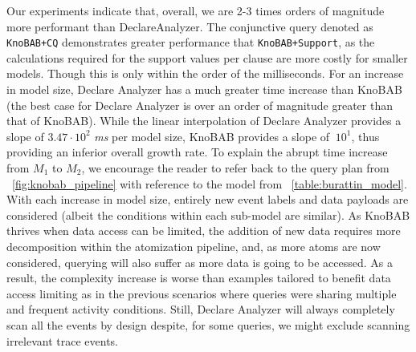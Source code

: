 Our experiments indicate that, overall, we are 2-3 times orders of magnitude more performant than DeclareAnalyzer. The conjunctive query denoted as \texttt{KnoBAB+CQ} demonstrates greater performance that \texttt{KnoBAB+Support}, as the calculations required for the support values per clause are more costly for smaller models. Though this is only within the order of the milliseconds. For an increase in model size, Declare Analyzer has a much greater time increase than KnoBAB (the best case for Declare Analyzer is over an order of magnitude greater than that of KnoBAB). %
While the linear interpolation of Declare Analyzer provides a slope of $3.47\cdot 10^2$ \textit{ms} per model size, KnoBAB provides a slope of $~10^1$, thus providing an inferior overall growth rate. To explain the abrupt time increase from $M_1$ to $M_2$, we encourage the reader to refer back to the query plan from \figurename~\ref{fig:knobab_pipeline} with reference to the model from \tablename~\ref{table:burattin_model}. With each increase in model size, entirely new event labels and data payloads are considered (albeit the conditions within each sub-model are similar). As KnoBAB thrives when data access can be limited, the addition of new data requires more decomposition within the atomization pipeline, and, as more atoms are now considered, querying will also suffer as more data is going to be accessed. As a result, the complexity increase is worse than examples tailored to benefit data access limiting as in the previous scenarios where queries were sharing multiple and frequent activity conditions. Still, Declare Analyzer will always completely scan all the events by design despite, for some queries, we might exclude scanning irrelevant trace events.



%
%
%

